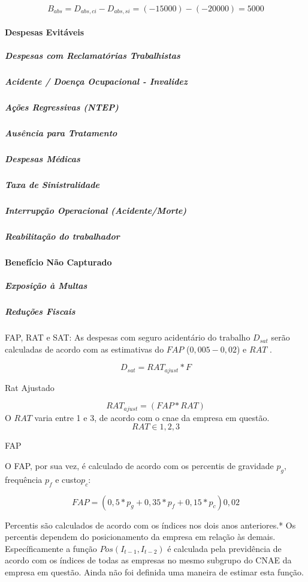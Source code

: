 \documentclass[]{article}
\let\oldparagraph\paragraph
\renewcommand{\paragraph}[1]{\oldparagraph{#1}\mbox{}}
\let\oldsubparagraph\subparagraph
\renewcommand{\subparagraph}[1]{\oldsubparagraph{#1}\mbox{}}
\begin{document}
\[B_{abs} = {D}_{abs, ci} - {D}_{abs, si} = (-15000)-(-20000) = 5000\]

\paragraph{Despesas Evitáveis}\label{despesas-evitaveis}

\subparagraph{Despesas com Reclamatórias
Trabalhistas}\label{despesas-com-reclamatorias-trabalhistas}

\subparagraph{Acidente / Doença Ocupacional -
Invalidez}\label{acidente-doenca-ocupacional---invalidez}

\subparagraph{Ações Regressivas (NTEP)}\label{acoes-regressivas-ntep}

\subparagraph{Ausência para Tratamento}\label{ausencia-para-tratamento}

\subparagraph{Despesas Médicas}\label{despesas-medicas}

\subparagraph{Taxa de Sinistralidade}\label{taxa-de-sinistralidade}

\subparagraph{Interrupção Operacional
(Acidente/Morte)}\label{interrupcao-operacional-acidentemorte}

\subparagraph{Reabilitação do
trabalhador}\label{reabilitacao-do-trabalhador}

\paragraph{Benefício Não Capturado}\label{beneficio-nao-capturado}

\subparagraph{Exposição à Multas}\label{exposicao-a-multas}

\subparagraph{Reduções Fiscais}\label{reducoes-fiscais}

FAP, RAT e SAT: As despesas com seguro acidentário do trabalho
\(D_{sat}\) serão calculadas de acordo com as estimativas do \(FAP\)
(\(0,005 - 0,02\)) e \(RAT\) .

\[D_{sat} = RAT_{ajust}* F\]

Rat Ajustado

\[RAT_{ajust} = (FAP * RAT)\] O \(RAT\) varia entre 1 e 3, de acordo com
o cnae da empresa em questão. \[RAT \in {1,2,3}\]

FAP

O FAP, por sua vez, é calculado de acordo com os percentis de gravidade
\(p_g\), frequência \(p_{f}\) e custo\(p_c\):

\[FAP = (0,5*p_g + 0,35*p_{f}+0,15*p_c)0,02\]

Percentis são calculados de acordo com os índices nos dois anos
anteriores.* Os percentis dependem do posicionamento da empresa em
relação às demais. Específicamente a função \(Pos(I_{t-1},I_{t-2})\) é
calculada pela previdência de acordo com os índices de todas as empresas
no mesmo subgrupo do CNAE da empresa em questão. Ainda não foi definida
uma maneira de estimar esta função.
\end{document}
